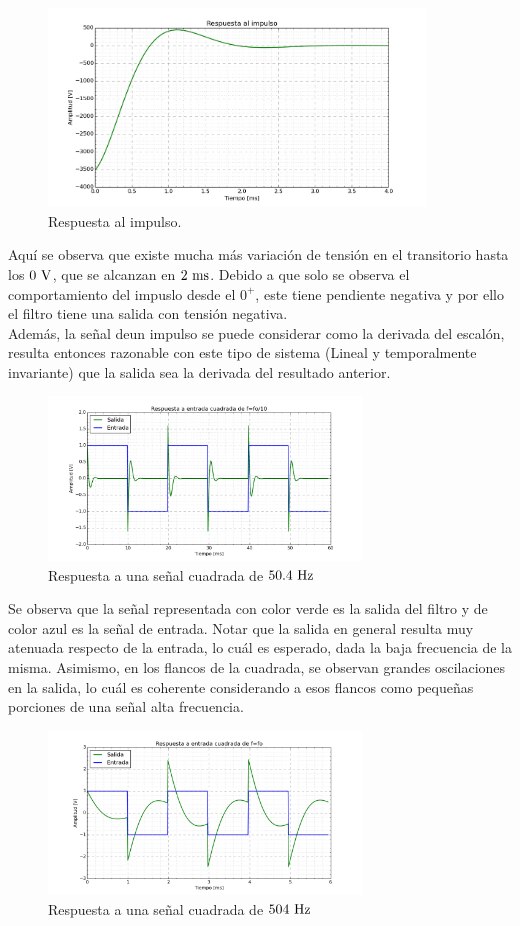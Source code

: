\begin{figure}[hbt]
	\centering
	\includegraphics[width=10cm]{imagenes/Impulse}	\caption{Respuesta al impulso.}
\end{figure}
Aqu\'i se observa que existe mucha m\'as variaci\'on de tensi\'on en el transitorio hasta los $0\ \si{\volt}$, que se alcanzan en $2 \ \si{\milli\second}$. Debido a que solo se observa el comportamiento del impuslo desde el $0^+$, este tiene pendiente negativa y por ello el filtro tiene una salida con tensi\'on negativa. \\
Adem\'as, la señal deun impulso se puede considerar como la derivada del escal\'on, resulta entonces razonable con este tipo de sistema (Lineal y temporalmente invariante) que la salida sea la derivada del resultado anterior.

\begin{figure}[H]
	\centering
	\includegraphics[width=8.3cm]{imagenes/Cuadrada_f:10}	\caption{Respuesta a una señal cuadrada de $50.4\ \si{\hertz}$}	
\end{figure}

Se observa que la señal representada con color verde es la salida  del filtro y de color azul es la señal de entrada. Notar que la salida en general resulta muy atenuada respecto de la entrada,  lo cu\'al es esperado, dada la baja frecuencia de la misma. Asimismo, en los flancos de la cuadrada, se observan grandes oscilaciones en la salida, lo cu\'al es coherente considerando a esos flancos como pequeñas porciones de una señal alta frecuencia.\\

\begin{figure}[hbt]
	\centering
	\includegraphics[width=8.3cm]{imagenes/Cuadrada_f}	\caption{Respuesta a una señal cuadrada de $504\ \si{\hertz}$}	
\end{figure}

